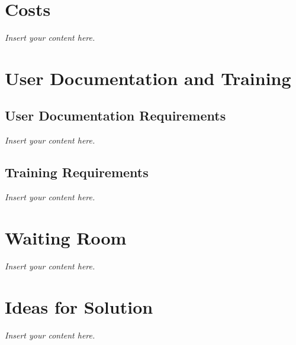 \documentclass[12pt]{article}
\newcommand{\lips}{\textit{Insert your content here.}}
\begin{document}
\begin{itemize}
\section{Costs}
\lips
\section{User Documentation and Training}
\subsection{User Documentation Requirements}
\lips
\subsection{Training Requirements}
\lips

\section{Waiting Room}
\lips

\section{Ideas for Solution}
\lips

\newpage
    \begin{landscape}

\end{landscape}
\end{itemize}
\end{document}
